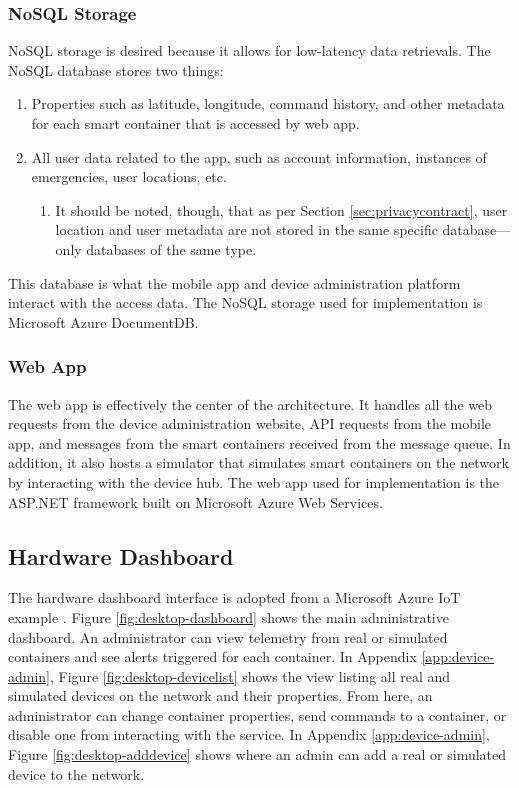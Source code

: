 \subsubsection{NoSQL Storage}

NoSQL storage is desired because it allows for low-latency data retrievals. The NoSQL database stores two things:
\begin{enumerate}
    \item Properties such as latitude, longitude, command history, and other metadata for each smart container that is accessed by web app.
    \item All user data related to the app, such as account information, instances of emergencies, user locations, etc.
    \begin{enumerate}
        \item It should be noted, though, that as per Section \ref{sec:privacycontract}, user location and user metadata are not stored in the same specific database---only databases of the same type.
    \end{enumerate}
\end{enumerate}

This database is what the mobile app and device administration platform interact with the access data. The NoSQL storage used for implementation is Microsoft Azure DocumentDB.

\subsubsection{Web App} \label{sec:webapp}

The web app is effectively the center of the architecture. It handles all the web requests from the device administration website, API requests from the mobile app, and messages from the smart containers received from the message queue. In addition, it also hosts a simulator that simulates smart containers on the network by interacting with the device hub. The web app used for implementation is the ASP.NET framework built on Microsoft Azure Web Services.

\subsection{Hardware Dashboard}

The hardware dashboard interface is adopted from a Microsoft Azure IoT example \cite{azure-iot-walk}. Figure \ref{fig:desktop-dashboard} shows the main administrative dashboard. An administrator can view telemetry from real or simulated containers and see alerts triggered for each container. In Appendix \ref{app:device-admin}, Figure \ref{fig:desktop-devicelist} shows the view listing all real and simulated devices on the network and their properties. From here, an administrator can change container properties, send commands to a container, or disable one from interacting with the service. In Appendix \ref{app:device-admin}, Figure \ref{fig:desktop-adddevice} shows where an admin can add a real or simulated device to the network.


